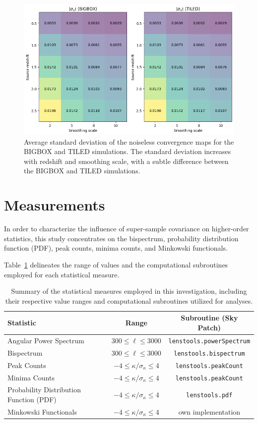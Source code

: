 \begin{figure}[ht]
    \centering
    \includegraphics[width=\textwidth]{figures/avg_sigma0.png}
    \caption{Average standard deviation of the noiseless convergence maps for the BIGBOX and TILED simulations. The standard deviation increases with redshift and smoothing scale, with a subtle difference between the BIGBOX and TILED simulations.} \label{fig:avg_sigma0}
\end{figure}

\section{Measurements}
In order to characterize the influence of super-sample covariance on higher-order statistics, this study concentrates on the bispectrum, probability distribution function (PDF), peak counts, minima counts, and Minkowski functionals. 

Table~\ref{tab:statistics} delineates the range of values and the computational subroutines employed for each statistical measure. 
\begin{table}[htbp]
    \centering
    \begin{tabular}{lcc}
    \toprule
    \textbf{Statistic} & \textbf{Range} & \textbf{Subroutine (Sky Patch)} \\
    \midrule
    Angular Power Spectrum & $300 \leq \ell \leq 3000$ & \texttt{lenstools.powerSpectrum} \\
    Bispectrum & $300 \leq \ell \leq 3000$ & \texttt{lenstools.bispectrum} \\
    Peak Counts & $-4 \leq \kappa/\sigma_\kappa \leq 4$ & \texttt{lenstools.peakCount} \\
    Minima Counts & $-4 \leq \kappa/\sigma_\kappa \leq 4$ & \texttt{lenstools.peakCount} \\
    Probability Distribution Function (PDF) & $-4 \leq \kappa/\sigma_\kappa \leq 4$ & \texttt{lenstools.pdf} \\
    Minkowski Functionals & $-4 \leq \kappa/\sigma_\kappa \leq 4$ & own implementation \\
    \bottomrule
    \end{tabular}
    \caption{Summary of the statistical measures employed in this investigation, including their respective value ranges and computational subroutines utilized for analyses.}\label{tab:statistics}
\end{table}

